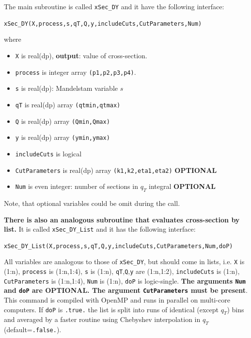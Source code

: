 \documentclass[prd,nofootinbib,eqsecnum,final]{revtex4}
\renewcommand{\(}{\left(}
\renewcommand{\)}{\right)}
\renewcommand{\[}{\left[}
\renewcommand{\]}{\right]}
\newcommand{\blue}[1]{{\color{blue} #1}}
\begin{document}
\begin{tcolorbox}
The main subroutine is called \texttt{xSec\_DY} and it have the following interface:

\begin{center}
\texttt{xSec\_DY(X,process,s,qT,Q,y,includeCuts,CutParameters,Num)}
\end{center}

where
\begin{itemize}
\item \texttt{X} is real(dp), \textbf{output}: value of cross-section.
\item \texttt{process} is integer array \texttt{(p1,p2,p3,p4)}.
\item \texttt{s} is real(dp): Mandelstam variable $s$
\item \texttt{qT} is real(dp) array \texttt{(qtmin,qtmax)}
\item \texttt{Q} is real(dp) array \texttt{(Qmin,Qmax)}
\item \texttt{y} is real(dp) array \texttt{(ymin,ymax)}
\item \texttt{includeCuts} is logical
\item \texttt{CutParameters} is real(dp) array \texttt{(k1,k2,eta1,eta2)} \textbf{OPTIONAL}
\item \texttt{Num} is even integer: number of sections in $q_T$ integral \textbf{OPTIONAL}
\end{itemize}
Note, that optional variables could be omit during the call. 
\end{tcolorbox}

\begin{tcolorbox}
\textbf{\blue{There is also an analogous subroutine that evaluates cross-section by list.}} It is called \texttt{xSec\_DY\_List} and it has the following interface:
\begin{center}
\texttt{xSec\_DY\_List(X,process,s,qT,Q,y,includeCuts,CutParameters,Num,doP)}
\end{center}
All variables are analogous to those of \texttt{xSec\_DY}, but should come in lists, i.e. \texttt{X} is (1:n), \texttt{process} is (1:n,1:4), \texttt{s} is (1:n), \texttt{qT},\texttt{Q},\texttt{y} are (1:n,1:2), \texttt{includeCuts} is (1:n), \texttt{CutParameters} is (1:n,1:4), \texttt{Num} is (1:n), \texttt{doP} is logic-single. \textbf{The arguments \texttt{Num} and \texttt{doP} are OPTIONAL. The argument \texttt{CutParameters} must be present}. This command is compiled with OpenMP and runs in parallel on multi-core computers. If \texttt{doP} is \texttt{.true.} the list is split into runs of identical (except $q_T$) bins and averaged by a faster routine using Chebyshev interpolation in $q_T$ (default=\texttt{.false.}).
\end{tcolorbox}
\end{document}
